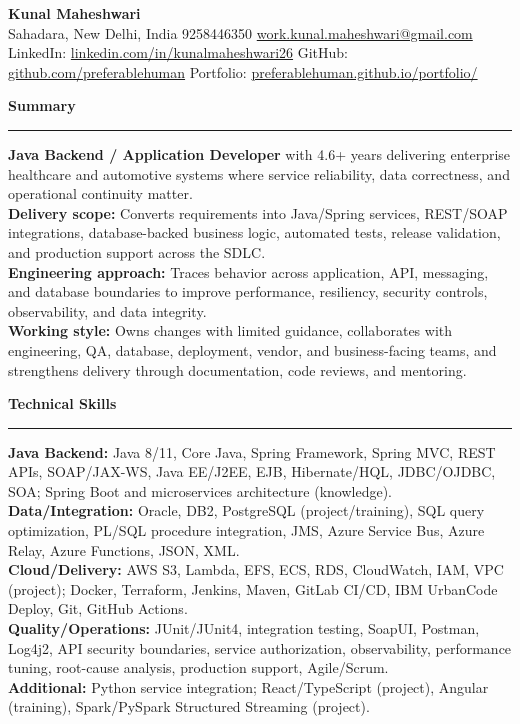 \documentclass[11pt,letterpaper]{article}
\newcommand{\ressection}[1]{\Needspace{6\baselineskip}\vspace{8pt}\par\textbf{#1}\par\vspace{2pt}\hrule\vspace{5pt}}
\begin{document}
\pagestyle{empty}\raggedright\fontsize{11}{12.5}\selectfont

{\Large \textbf{Kunal Maheshwari}}\\
Sahadara, New Delhi, India \textbar{} 9258446350 \textbar{} \href{mailto:work.kunal.maheshwari@gmail.com}{work.kunal.maheshwari@gmail.com}\\
LinkedIn: \href{https://www.linkedin.com/in/kunalmaheshwari26}{linkedin.com/in/kunalmaheshwari26} \textbar{} GitHub: \href{https://github.com/preferablehuman}{github.com/preferablehuman} \textbar{} Portfolio: \href{https://preferablehuman.github.io/portfolio/}{preferablehuman.github.io/portfolio/}

\ressection{Summary}
\textbf{Java Backend / Application Developer} with 4.6+ years delivering enterprise healthcare and automotive systems where service reliability, data correctness, and operational continuity matter.\\[2pt]
\textbf{Delivery scope:} Converts requirements into Java/Spring services, REST/SOAP integrations, database-backed business logic, automated tests, release validation, and production support across the SDLC.\\[2pt]
\textbf{Engineering approach:} Traces behavior across application, API, messaging, and database boundaries to improve performance, resiliency, security controls, observability, and data integrity.\\[2pt]
\textbf{Working style:} Owns changes with limited guidance, collaborates with engineering, QA, database, deployment, vendor, and business-facing teams, and strengthens delivery through documentation, code reviews, and mentoring.

\ressection{Technical Skills}
\textbf{Java Backend:} Java 8/11, Core Java, Spring Framework, Spring MVC, REST APIs, SOAP/JAX-WS, Java EE/J2EE, EJB, Hibernate/HQL, JDBC/OJDBC, SOA; Spring Boot and microservices architecture (knowledge).\\
\textbf{Data/Integration:} Oracle, DB2, PostgreSQL (project/training), SQL query optimization, PL/SQL procedure integration, JMS, Azure Service Bus, Azure Relay, Azure Functions, JSON, XML.\\
\textbf{Cloud/Delivery:} AWS S3, Lambda, EFS, ECS, RDS, CloudWatch, IAM, VPC (project); Docker, Terraform, Jenkins, Maven, GitLab CI/CD, IBM UrbanCode Deploy, Git, GitHub Actions.\\
\textbf{Quality/Operations:} JUnit/JUnit4, integration testing, SoapUI, Postman, Log4j2, API security boundaries, service authorization, observability, performance tuning, root-cause analysis, production support, Agile/Scrum.\\
\textbf{Additional:} Python service integration; React/TypeScript (project), Angular (training), Spark/PySpark Structured Streaming (project).
\end{document}
